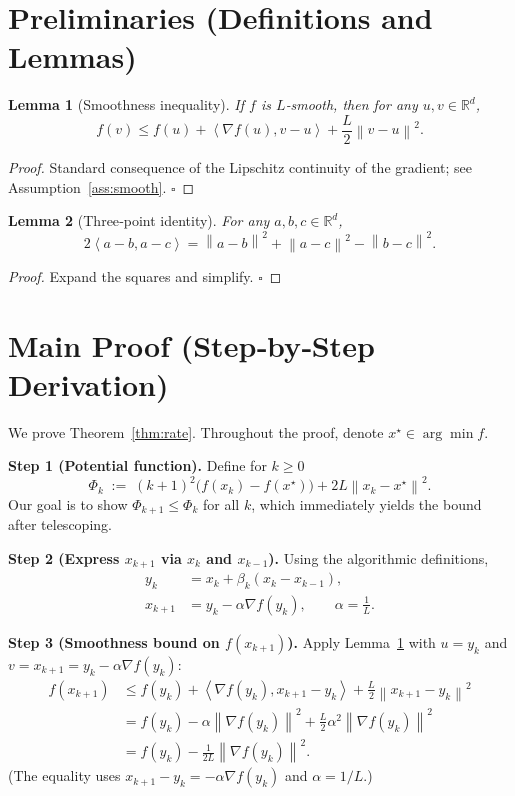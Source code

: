 \documentclass{article}
\newtheorem{lemma}{Lemma}
\newcommand{\norm}[1]{\left\lVert#1\right\rVert}
\newcommand{\ip}[2]{\left\langle #1,#2\right\rangle}
\begin{document}
\newpage
\section*{Preliminaries (Definitions and Lemmas)}
\begin{lemma}[Smoothness inequality]\label{lem:smooth}
If $f$ is $L$‑smooth, then for any $u,v\in\mathbb R^d$,
\[
f(v)\le f(u)+\ip{\nabla f(u)}{v-u}+\frac{L}{2}\norm{v-u}^2 .
\]
\end{lemma}
\begin{proof}
Standard consequence of the Lipschitz continuity of the gradient; see Assumption~\ref{ass:smooth}. $\square$
\end{proof}

\begin{lemma}[Three‑point identity]\label{lem:three}
For any $a,b,c\in\mathbb R^d$,
\[
2\ip{a-b}{a-c}= \norm{a-b}^2+\norm{a-c}^2-\norm{b-c}^2 .
\]
\end{lemma}
\begin{proof}
Expand the squares and simplify. $\square$
\end{proof}

\section*{Main Proof (Step‑by‑Step Derivation)}
We prove Theorem~\ref{thm:rate}. Throughout the proof, denote $x^\star\in\arg\min f$.

\bigskip
\noindent\textbf{Step 1 (Potential function).} Define for $k\ge 0$
\[
\Phi_k \;:=\; (k+1)^2\bigl(f(x_k)-f(x^\star)\bigr) + 2L\norm{x_k-x^\star}^2 . \tag{1}
\]
Our goal is to show $\Phi_{k+1}\le \Phi_k$ for all $k$, which immediately yields the bound after telescoping.

\bigskip
\noindent\textbf{Step 2 (Express $x_{k+1}$ via $x_k$ and $x_{k-1}$).} Using the algorithmic definitions,
\[
\begin{aligned}
y_k &= x_k + \beta_k (x_k-x_{k-1}),\\
x_{k+1} &= y_k -\alpha\nabla f(y_k), \qquad \alpha=\tfrac1L .
\end{aligned}
\tag{2}
\]

\bigskip
\noindent\textbf{Step 3 (Smoothness bound on $f(x_{k+1})$).} Apply Lemma~\ref{lem:smooth} with $u=y_k$ and $v=x_{k+1}=y_k-\alpha\nabla f(y_k)$:
\[
\begin{aligned}
f(x_{k+1}) &\le f(y_k) + \ip{\nabla f(y_k)}{x_{k+1}-y_k}
               +\frac{L}{2}\norm{x_{k+1}-y_k}^2  \\
           &= f(y_k) -\alpha\norm{\nabla f(y_k)}^2
               +\frac{L}{2}\alpha^2\norm{\nabla f(y_k)}^2 \\[2mm]
           &= f(y_k) -\frac{1}{2L}\norm{\nabla f(y_k)}^2 . \tag{3}
\end{aligned}
\]
(The equality uses $x_{k+1}-y_k=-\alpha\nabla f(y_k)$ and $\alpha=1/L$.)
\end{document}
